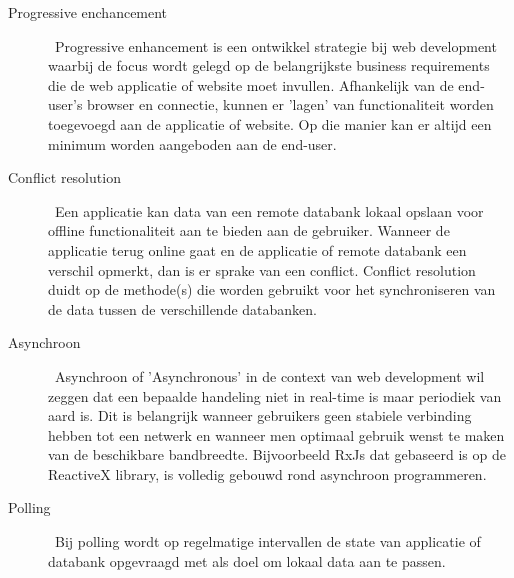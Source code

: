 \begin{description}
\item[Progressive enchancement] \hfill \ Progressive enhancement is een ontwikkel strategie bij web development waarbij de focus wordt gelegd op de belangrijkste business requirements die de web applicatie of website moet invullen. Afhankelijk van de end-user's browser en connectie, kunnen er 'lagen' van functionaliteit worden toegevoegd aan de applicatie of website. Op die manier kan er altijd een minimum worden aangeboden aan de end-user.
\item[Conflict resolution] \hfill \ Een applicatie kan data van een remote databank lokaal opslaan voor offline functionaliteit aan te bieden aan de gebruiker. Wanneer de applicatie terug online gaat en de applicatie of remote databank een verschil opmerkt, dan is er sprake van een conflict. Conflict resolution duidt op de methode(s) die worden gebruikt voor het synchroniseren van de data tussen de verschillende databanken.
\item[Asynchroon] \hfill \ Asynchroon of 'Asynchronous' in de context van web development wil zeggen dat een bepaalde handeling niet in real-time is maar periodiek van aard is. Dit is belangrijk wanneer gebruikers geen stabiele verbinding hebben tot een netwerk en wanneer men optimaal gebruik wenst te maken van de beschikbare bandbreedte. Bijvoorbeeld RxJs dat gebaseerd is op de ReactiveX library, is volledig gebouwd rond asynchroon programmeren.
\item[Polling] \hfill \ Bij polling wordt op regelmatige intervallen de state van applicatie of databank opgevraagd met als doel om lokaal data aan te passen.
\end{description}